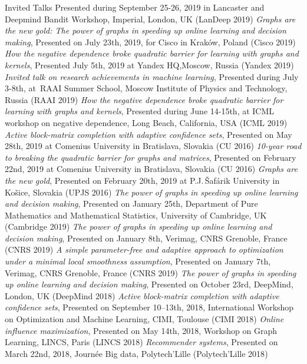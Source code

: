 \documentclass{resume}
\begin{document}
\begin{category}{Invited Talks}
Presented during September 25-26, 2019 in Lancaster and Deepmind Bandit Workshop, Imperial, London, UK
({\sf LanDeep 2019})
\citembullet
\emph{Graphs are the new gold: The power of graphs in speeding up online learning and decision making},
Presented on July 23th, 2019, for Cisco in Krak\'ow, Poland
({\sf Cisco  2019})
\citembullet
\emph{How the negative dependence broke quadratic barrier for learning with graphs and kernels},
Presented July 5th, 2019 at Yandex HQ,Moscow, Russia
({\sf Yandex  2019})
\citembullet
\emph{Invited talk on research achievements in machine learning},
Presented during July 3-8th, at~RAAI Summer School, Moscow Institute of Physics and Technology, Russia
({\sf RAAI  2019})
\citembullet
\emph{How the negative dependence broke quadratic barrier for learning with graphs and kernels},
Presented during June 14-15th, at ICML workshop on negative dependence, Long Beach, California, USA 
({\sf ICML  2019})
\citembullet
\emph{Active block-matrix completion with adaptive confidence sets}, Presented on May 28th, 2019 at Comenius University in Bratislava, Slovakia 
({\sf CU 2016})
\citembullet
\emph{10-year road to breaking the quadratic barrier for graphs and matrices}, Presented on February 22nd, 2019 at Comenius University in Bratislava, Slovakia 
({\sf CU 2016})
\citembullet
\emph{Graphs are the new gold}, Presented on February 20th, 2019 at P.J.\,\v{S}af\'arik University in Ko\v{s}ice, Slovakia
({\sf UPJS 2016})
\citembullet
\emph{The power of graphs in speeding up online learning and decision making},
Presented on January 25th, Department of Pure Mathematics and Mathematical Statistics, University of Cambridge, UK
({\sf Cambridge  2019})
\citembullet
\emph{The power of graphs in speeding up online learning and decision making},
Presented on January 8th, Verimag, CNRS Grenoble, France
({\sf CNRS  2019})
\citembullet
\emph{A simple parameter-free and adaptive approach to optimization under a minimal local smoothness assumption},
Presented on January 7th, Verimag, CNRS Grenoble, France
({\sf CNRS  2019})
\citembullet
\emph{The power of graphs in speeding up online learning and decision making},
Presented on October 23rd, DeepMind, London, UK
({\sf DeepMind  2018})
\citembullet
\emph{Active block-matrix completion with adaptive confidence sets},  Presented on September 10--13th, 2018,  International Workshop  on Optimization and Machine Learning, CIMI, Toulouse ({\sf CIMI 2018})
\citembullet
\emph{Online influence maximization},  Presented on May 14th, 2018, Workshop on Graph Learning, LINCS, Paris ({\sf LINCS 2018})
\citembullet
\emph{Recommender systems},  Presented on March 22nd, 2018, Journ\' ee Big data, Polytech'Lille ({\sf Polytech'Lille 2018})

\end{category}
\end{document}
